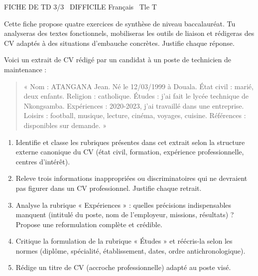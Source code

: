 \documentclass[11pt]{article}
\begin{document}
\begin{tcolorbox}[enhanced,colback=popink,colframe=popink,arc=10pt,boxrule=0pt,left=12pt,right=12pt,top=9pt,bottom=9pt]
{\color{white}\popxbold\small FICHE DE TD 3/3 \textbullet\ DIFFICILE \hfill Français \textbullet\ Tle T\par}
\end{tcolorbox}
\vspace{4pt}
Cette fiche propose quatre exercices de synthèse de niveau baccalauréat. Tu analyseras des textes fonctionnels, mobiliseras les outils de liaison et rédigeras des CV adaptés à des situations d'embauche concrètes. Justifie chaque réponse.

\begin{exercice}
Voici un extrait de CV rédigé par un candidat à un poste de technicien de maintenance :
\begin{quote}
« Nom : ATANGANA Jean. Né le 12/03/1999 à Douala. État civil : marié, deux enfants. Religion : catholique. Études : j'ai fait le lycée technique de Nkongsamba. Expériences : 2020-2023, j'ai travaillé dans une entreprise. Loisirs : football, musique, lecture, cinéma, voyages, cuisine. Références : disponibles sur demande. »
\end{quote}
\begin{enumerate}
\item Identifie et classe les rubriques présentes dans cet extrait selon la structure externe canonique du CV (état civil, formation, expérience professionnelle, centres d'intérêt).
\item Releve trois informations inappropriées ou discriminatoires qui ne devraient pas figurer dans un CV professionnel. Justifie chaque retrait.
\item Analyse la rubrique « Expériences » : quelles précisions indispensables manquent (intitulé du poste, nom de l'employeur, missions, résultats) ? Propose une reformulation complète et crédible.
\item Critique la formulation de la rubrique « Études » et réécris-la selon les normes (diplôme, spécialité, établissement, dates, ordre antichronologique).
\item Rédige un titre de CV (accroche professionnelle) adapté au poste visé.
\end{enumerate}
\end{exercice}
\end{document}
